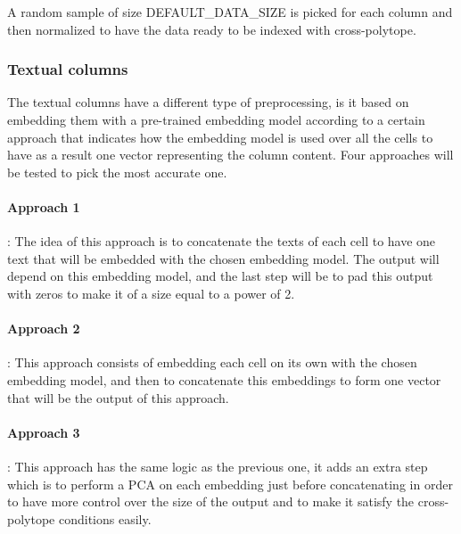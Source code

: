 A random sample of size \mbox{DEFAULT\_DATA\_SIZE} is picked for each column
and then normalized to have the data ready to be indexed with cross-polytope.

\subsubsection{Textual columns}
The textual columns have a different type of preprocessing, is it based on
embedding them with a pre-trained embedding model according to a certain
approach that indicates how the embedding model is used over all the cells to
have as a result one vector representing the column content. Four approaches
will be tested to pick the most accurate one.

\paragraph{Approach 1}: The idea of this approach is to concatenate the texts of
each cell to have one text that will be embedded with the chosen embedding
model. The output will depend on this embedding model, and the last step will be
to pad this output with zeros to make it of a size equal to a power of 2.

\paragraph{Approach 2}: This approach consists of embedding each cell on its own
with the chosen embedding model, and then to concatenate this embeddings to form
one vector that will be the output of this approach.

\paragraph{Approach 3}: This approach has the same logic as the previous one, it
adds an extra step which is to perform a PCA on each embedding just before
concatenating in order to have more control over the size of the output and to
make it satisfy the cross-polytope conditions easily.

